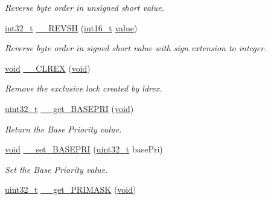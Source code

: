 \begin{DoxyCompactItemize}
\begin{DoxyCompactList}\small\item\em Reverse byte order in unsigned short value. \end{DoxyCompactList}\item 
\hyperlink{group___n_a_m_e_gafd12020da5a235dfcf0c3c748fb5baed}{int32\-\_\-t} \hyperlink{group___c_m_s_i_s___c_m3__core__definitions_gac57c8f1832bf1d42d49d62a56871a78e}{\-\_\-\-\_\-\-R\-E\-V\-S\-H} (\hyperlink{stdint_8h_aa343fa3b3d06292b959ffdd4c4703b06}{int16\-\_\-t} \hyperlink{protocol_8h_a4e9aec275e566b978a3ccb4e043d8c61}{value})
\begin{DoxyCompactList}\small\item\em Reverse byte order in signed short value with sign extension to integer. \end{DoxyCompactList}\item 
\hyperlink{group___n_a_m_e_ga18028b8badbf1ea7e704ccac3c488e82}{void} \hyperlink{group___c_m_s_i_s___c_m3__core__definitions_ga354c5ac8870cc3dfb823367af9c4b412}{\-\_\-\-\_\-\-C\-L\-R\-E\-X} (\hyperlink{group___n_a_m_e_ga18028b8badbf1ea7e704ccac3c488e82}{void})
\begin{DoxyCompactList}\small\item\em Remove the exclusive lock created by ldrex. \end{DoxyCompactList}\item 
\hyperlink{stdint_8h_a435d1572bf3f880d55459d9805097f62}{uint32\-\_\-t} \hyperlink{group___c_m_s_i_s___c_m3__core__definitions_ga32da759f46e52c95bcfbde5012260667}{\-\_\-\-\_\-get\-\_\-\-B\-A\-S\-E\-P\-R\-I} (\hyperlink{group___n_a_m_e_ga18028b8badbf1ea7e704ccac3c488e82}{void})
\begin{DoxyCompactList}\small\item\em Return the Base Priority value. \end{DoxyCompactList}\item 
\hyperlink{group___n_a_m_e_ga18028b8badbf1ea7e704ccac3c488e82}{void} \hyperlink{group___c_m_s_i_s___c_m3__core__definitions_ga360c73eb7ffb16088556f9278953b882}{\-\_\-\-\_\-set\-\_\-\-B\-A\-S\-E\-P\-R\-I} (\hyperlink{stdint_8h_a435d1572bf3f880d55459d9805097f62}{uint32\-\_\-t} base\-Pri)
\begin{DoxyCompactList}\small\item\em Set the Base Priority value. \end{DoxyCompactList}\item 
\hyperlink{stdint_8h_a435d1572bf3f880d55459d9805097f62}{uint32\-\_\-t} \hyperlink{group___c_m_s_i_s___c_m3__core__definitions_ga799b5d9a2ae75e459264c8512c7c0e02}{\-\_\-\-\_\-get\-\_\-\-P\-R\-I\-M\-A\-S\-K} (\hyperlink{group___n_a_m_e_ga18028b8badbf1ea7e704ccac3c488e82}{void})

\end{DoxyCompactItemize}
